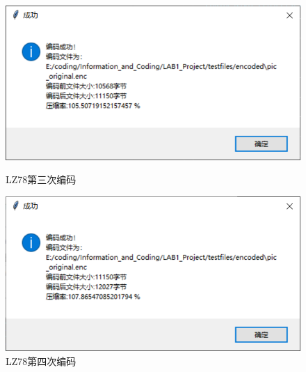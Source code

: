 \documentclass[12pt, a4paper]{ctexart}
\begin{document}
    \begin{figure}[H]
    \centering
    \begin{minipage}[t]{0.45\textwidth}
    \centering
    \includegraphics[width=\textwidth]{./pic/12-3.png}
    \caption{LZ78第三次编码}
    \end{minipage}
    \hfill
    \begin{minipage}[t]{0.45\textwidth}
    \centering
    \includegraphics[width=\textwidth]{./pic/12-4.png}
    \caption{LZ78第四次编码}
    \end{minipage}
    \end{figure}
\end{document}
